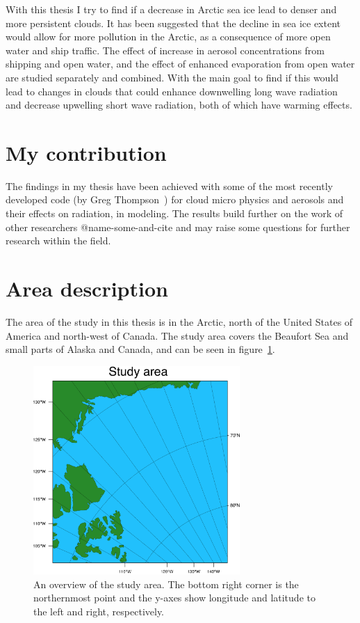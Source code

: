 With this thesis I try to find if a decrease in Arctic sea ice lead to denser and more persistent clouds. It has been suggested that the decline in sea ice extent would allow for more pollution in the Arctic, as a consequence of more open water and ship traffic. The effect of increase in aerosol concentrations from shipping and open water, and the effect of enhanced evaporation from open water are studied separately and combined. With the main goal to find if this would lead to changes in clouds that could enhance downwelling long wave radiation and decrease upwelling short wave radiation, both of which have warming effects.


\section{My contribution}%
The findings in my thesis have been achieved with some of the most recently developed code (by Greg Thompson~\citep{Thompson2014}) for cloud micro physics and aerosols and their effects on radiation, in modeling. The results build further on the work of other researchers @name-some-and-cite and may raise some questions for further research within the field.

\section{Area description}
The area of the study in this thesis is in the Arctic, north of the United States of America and north-west of Canada. The study area covers the Beaufort Sea and small parts of Alaska and Canada, and can be seen in figure~\ref{fig:area}.

\begin{figure}
\centering
\includegraphics[width=0.7\textwidth]{introduction/studyarea.png}
\caption{An overview of the study area. The bottom right corner is the northernmost point and the y-axes show longitude and latitude to the left and right, respectively.}
\label{fig:area}
\end{figure}
 
